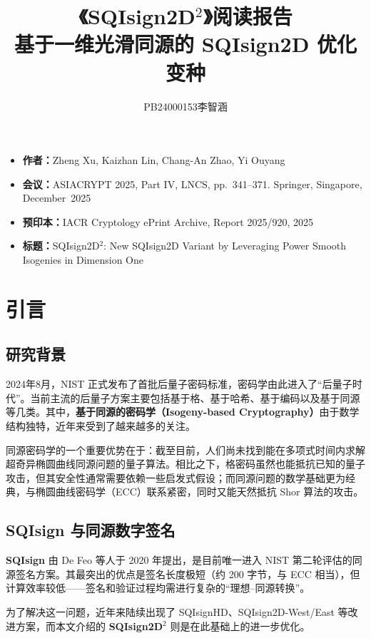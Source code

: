 \documentclass[12pt,a4paper]{ctexart}
\title{\textbf{《SQIsign2D$^2$》阅读报告}\\[0.3em]
\large 基于一维光滑同源的 SQIsign2D 优化变种}
\author{PB24000153\quad 李智涵}
\date{}
\theoremstyle{remark}
\begin{document}
\maketitle

\begin{paperinfo}
\begin{itemize}[leftmargin=1.5em]
  \item \textbf{作者：}Zheng Xu, Kaizhan Lin, Chang-An Zhao, Yi Ouyang
  \item \textbf{会议：}ASIACRYPT 2025, Part IV, LNCS, pp.~341--371. Springer, Singapore, December~2025
  \item \textbf{预印本：}IACR Cryptology ePrint Archive, Report 2025/920, 2025
  \item \textbf{标题：}SQIsign2D$^2$: New SQIsign2D Variant by Leveraging Power Smooth Isogenies in Dimension One
\end{itemize}
\end{paperinfo}

\section{引言}

\subsection{研究背景}

2024年8月，NIST 正式发布了首批后量子密码标准，密码学由此进入了``后量子时代''。当前主流的后量子方案主要包括基于格、基于哈希、基于编码以及基于同源等几类。其中，\textbf{基于同源的密码学（Isogeny-based Cryptography）}由于数学结构独特，近年来受到了越来越多的关注。

同源密码学的一个重要优势在于：截至目前，人们尚未找到能在多项式时间内求解超奇异椭圆曲线同源问题的量子算法。相比之下，格密码虽然也能抵抗已知的量子攻击，但其安全性通常需要依赖一些启发式假设；而同源问题的数学基础更为经典，与椭圆曲线密码学（ECC）联系紧密，同时又能天然抵抗 Shor 算法的攻击。

\subsection{SQIsign 与同源数字签名}

\textbf{SQIsign} 由 De Feo 等人于 2020 年提出，是目前唯一进入 NIST 第二轮评估的同源签名方案。其最突出的优点是签名长度极短（约 200 字节，与 ECC 相当），但计算效率较低——签名和验证过程均需进行复杂的``理想--同源转换''。

为了解决这一问题，近年来陆续出现了 SQIsignHD、SQIsign2D-West/East 等改进方案，而本文介绍的 \textbf{SQIsign2D$^2$} 则是在此基础上的进一步优化。
\end{document}
